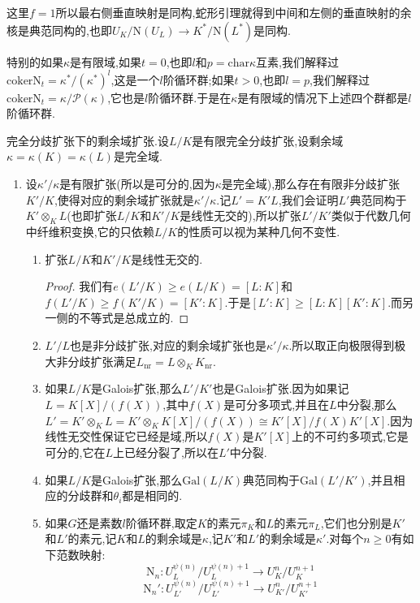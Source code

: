 \begin{enumerate}
\begin{enumerate}
\begin{itemize}
        	这里$f=1$所以最右侧垂直映射是同构,蛇形引理就得到中间和左侧的垂直映射的余核是典范同构的,也即$U_K/\mathrm{N}(U_L)\to K^*/\mathrm{N}(L^*)$是同构.
        \end{itemize}
    
        特别的如果$\kappa$是有限域,如果$t=0$,也即$l$和$p=\mathrm{char}\kappa$互素,我们解释过$\mathrm{coker}\mathrm{N}_t=\kappa^*/(\kappa^*)^l$,这是一个$l$阶循环群;如果$t>0$,也即$l=p$,我们解释过$\mathrm{coker}\mathrm{N}_t=\kappa/\mathscr{P}(\kappa)$,它也是$l$阶循环群.于是在$\kappa$是有限域的情况下上述四个群都是$l$阶循环群.
	\end{enumerate}
\end{enumerate}

完全分歧扩张下的剩余域扩张.设$L/K$是有限完全分歧扩张,设剩余域$\kappa=\kappa(K)=\kappa(L)$是完全域.
\begin{enumerate}
	\item 设$\kappa'/\kappa$是有限扩张(所以是可分的,因为$\kappa$是完全域),那么存在有限非分歧扩张$K'/K$,使得对应的剩余域扩张就是$\kappa'/\kappa$.记$L'=K'L$,我们会证明$L'$典范同构于$K'\otimes_KL$(也即扩张$L/K$和$K'/K$是线性无交的),所以扩张$L'/K'$类似于代数几何中纤维积变换,它的只依赖$L/K$的性质可以视为某种几何不变性.
	\begin{enumerate}
		\item 扩张$L/K$和$K'/K$是线性无交的.
		\begin{proof}
			
			我们有$e(L'/K)\ge e(L/K)=[L:K]$和$f(L'/K)\ge f(K'/K)=[K':K]$.于是$[L':K]\ge[L:K][K':K]$.而另一侧的不等式是总成立的.
		\end{proof}
	    \item $L'/L$也是非分歧扩张,对应的剩余域扩张也是$\kappa'/\kappa$.所以取正向极限得到极大非分歧扩张满足$L_{\mathrm{nr}}=L\otimes_KK_{\mathrm{nr}}$.
	    \item 如果$L/K$是Galois扩张,那么$L'/K'$也是Galois扩张.因为如果记$L=K[X]/(f(X))$,其中$f(X)$是可分多项式,并且在$L$中分裂,那么$L'=K'\otimes_KL=K'\otimes_KK[X]/(f(X))\cong K'[X]/f(X)K'[X]$.因为线性无交性保证它已经是域,所以$f(X)$是$K'[X]$上的不可约多项式,它是可分的,它在$L$上已经分裂了,所以在$L'$中分裂.
	    \item 如果$L/K$是Galois扩张,那么$\mathrm{Gal}(L/K)$典范同构于$\mathrm{Gal}(L'/K')$,并且相应的分歧群和$\theta_i$都是相同的.
	    \item 如果$G$还是素数$l$阶循环群,取定$K$的素元$\pi_K$和$L$的素元$\pi_L$,它们也分别是$K'$和$L'$的素元,记$K$和$L$的剩余域是$\kappa$,记$K'$和$L'$的剩余域是$\kappa'$.对每个$n\ge0$有如下范数映射:
	    $$\mathrm{N}_n:U_L^{\psi(n)}/U_L^{\psi(n)+1}\to U_K^n/U_K^{n+1}$$
	    $$\mathrm{N}_n':U_{L'}^{\psi(n)}/U_{L'}^{\psi(n)+1}\to U_{K'}^n/U_{K'}^{n+1}$$
	    

\end{enumerate}
\end{enumerate}
